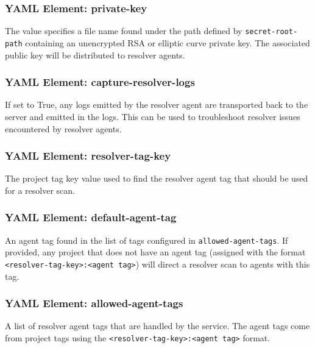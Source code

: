 \subsubsection{YAML Element: private-key}\label{sec:yaml-resolver-private-key}
The value specifies a file name found under the path defined by \texttt{secret-root-path}
containing an unencrypted RSA or elliptic curve private key.  The associated public key will be distributed to
resolver agents.


\subsubsection{YAML Element: capture-resolver-logs}\label{sec:yaml-resolver-capture-resolver-logs}
If set to True, any logs emitted by the resolver agent are transported back to the \cxoneflow server and
emitted in the \cxoneflow logs.  This can be used to troubleshoot resolver issues encountered by resolver
agents.

\subsubsection{YAML Element: resolver-tag-key}\label{sec:yaml-resolver-resolver-tag-key}
The \cxone project tag key value used to find the resolver agent tag that should be used for a resolver scan.

\subsubsection{YAML Element: default-agent-tag}\label{sec:yaml-resolver-default-agent-tag}
An agent tag found in the list of tags configured in \texttt{allowed-agent-tags}.  If provided,
any \cxone project that does not have an agent tag (assigned with the format \texttt{<resolver-tag-key>:<agent tag>})
will direct a resolver scan to agents with this tag.

\subsubsection{YAML Element: allowed-agent-tags}\label{sec:yaml-resolver-allowed-agent-tags}
A list of resolver agent tags that are handled by the \cxoneflow service.  The agent tags come from
\cxone project tags using the \texttt{<resolver-tag-key>:<agent tag>} format.  
